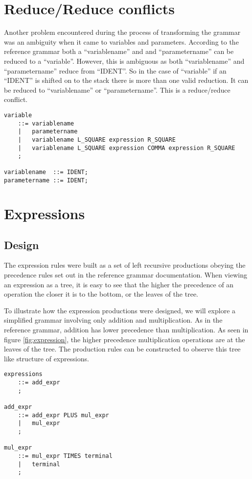 \documentclass[oneside]{amsart}
\theoremstyle{definition}
\theoremstyle{remark}
\numberwithin{equation}{section}
\begin{document}
\newpage

\section{Reduce/Reduce conflicts}
Another problem encountered during the process of transforming the grammar was an ambiguity when it
came to variables and parameters. According to the reference grammar both a ``variablename'' and
and ``parametername'' can be reduced to a ``variable''. However, this is ambiguous as both
``variablename'' and ``parametername'' reduce from ``IDENT''. So in the case of ``variable'' if
an ``IDENT'' is shifted on to the stack there is more than one valid reduction. It can be reduced to
``variablename'' or ``parametername''. This is a reduce/reduce conflict.

\begin{lstlisting}
variable
    ::= variablename
    |   parametername
    |   variablename L_SQUARE expression R_SQUARE
    |   variablename L_SQUARE expression COMMA expression R_SQUARE
    ;

variablename  ::= IDENT;
parametername ::= IDENT;
\end{lstlisting}

\section{Expressions}
\subsection{Design}
The expression rules were built as a set of left recursive productions obeying the precedence rules
set out in the reference grammar documentation. When viewing an expression as a tree, it is easy to
see that the higher the precedence of an operation the closer it is to the bottom, or the leaves of
the tree.



To illustrate how the expression productions were designed, we will explore a simplified grammar
involving only addition and multiplication. As in the reference grammar, addition has lower
precedence than multiplication. As seen in figure \ref{fig:expression}, the higher precedence
multiplication operations are at the leaves of the tree. The production rules can be constructed
to observe this tree like structure of expressions.

\begin{lstlisting}
expressions
    ::= add_expr
    ;

add_expr
    ::= add_expr PLUS mul_expr
    |   mul_expr
    ;

mul_expr
    ::= mul_expr TIMES terminal
    |   terminal
    ;
\end{lstlisting}
\end{document}

